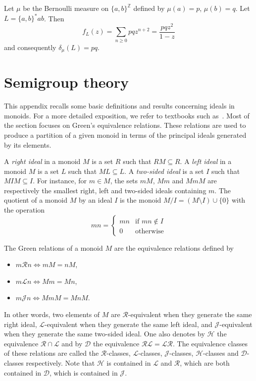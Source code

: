 \documentclass[a4paper,UKenglish,numberwithinsect,cleveref]{lipics-v2021}
\newcommand{\HH}{\mathrel{\mathscr{H}}}
\newcommand{\JJ}{\mathrel{\mathscr{J}}}
\newcommand{\DD}{\mathrel{\mathscr{D}}}
\newcommand{\RR}{\mathrel{\mathscr{R}}}
\newcommand{\LL}{\mathrel{\mathscr{L}}}
\newcommand{\Z}{\mathbb{Z}}
\begin{document}
\begin{example}
    Let $\mu$ be the Bernoulli measure on $\{a,b\}^\Z$ defined by $\mu(a)=p$, $\mu(b)=q$.  Let $L=\{a,b\}^*ab$. Then
    \[
        f_L(z)=\sum_{n\ge 0}pqz^{n+2}=\frac{pqz^2}{1-z}
    \]
    and consequently $\delta_\mu(L)=pq$.
\end{example}





\appendix

\section{Semigroup theory}
\label{appendix-semigroups}

This appendix recalls some basic definitions and results concerning ideals in monoids. For a more detailed exposition, we refer to textbooks such as~\cite{BerstelPerrinReutenauer2009,book/Lallement1979,book/Grillet1995,book/Howie1995,Eilenberg1974,Eilenberg1976}. Most of the section focuses on Green's equivalence relations. These relations are used to produce a partition of a given monoid in terms of the principal ideals generated by its elements. 

A \emph{right ideal} in a monoid $M$ is a set $R$ such that $RM\subseteq R$. A \emph{left ideal} in a monoid $M$ is a set $L$ such that $ML\subseteq L$. A \emph{two-sided ideal} is a set $I$ such that $MIM\subseteq I$. For instance, for $m\in M$, the sets $mM$, $Mm$ and $MmM$ are respectively the smallest right, left and two-sided ideals containing $m$. The quotient of a monoid $M$ by an ideal $I$ is the monoid $M/I=(M\setminus I)\cup\{0\}$ with the operation
\begin{displaymath}
    mn=
    \begin{cases}
        mn & \text{if $mn\notin I$}\\
        0  & \text{otherwise}
    \end{cases}
\end{displaymath}

The Green relations of a monoid $M$ are the equivalence relations defined by
\begin{itemize}
    \item $m\RR n \iff mM=nM$, 
    \item $m\LL n \iff Mm=Mn$,
    \item $m\JJ n \iff MmM=MnM$.
\end{itemize}
In other words, two elements of $M$ are $\RR$-equivalent when they generate the same right ideal, $\LL$-equivalent when they generate the same left ideal, and $\JJ$-equivalent when they generate the same two-sided ideal. One also denotes by $\HH$ the equivalence $\RR\cap \LL$ and by $\DD$ the equivalence $\RR\LL=\LL\RR$. The equivalence classes of these relations are called the $\RR$-classes, $\LL$-classes, $\JJ$-classes, $\HH$-classes and $\DD$-classes respectively. Note that $\HH$ is contained in $\LL$ and $\RR$, which are both contained in $\DD$, which is contained in $\JJ$. 
\end{document}
